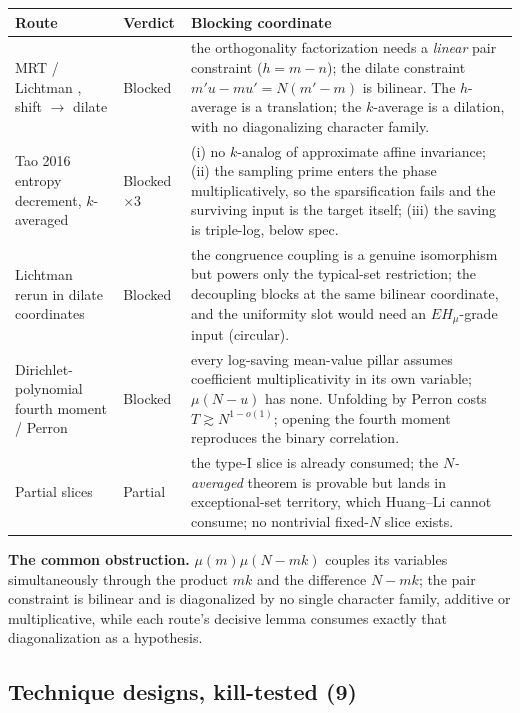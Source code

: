 \documentclass[11pt,a4paper]{article}
\theoremstyle{plain}
\theoremstyle{definition}
\begin{document}
\begin{longtable}{p{}p{}p{}}
\hline
Route & Verdict & Blocking coordinate\\
\hline
\endhead
MRT \cite{MRT15} / Lichtman \cite{Li20}, shift $\to$ dilate & Blocked &
 the orthogonality factorization needs a \emph{linear} pair
 constraint ($h = m-n$); the dilate constraint
 $m'u - mu' = N(m'-m)$ is bilinear. The $h$-average is a translation;
 the $k$-average is a dilation, with no diagonalizing character
 family.\\
Tao 2016 \cite{Tao} entropy decrement, $k$-averaged & Blocked $\times 3$ &
 (i) no $k$-analog of approximate affine invariance; (ii) the sampling
 prime enters the phase multiplicatively, so the sparsification fails
 and the surviving input is the target itself; (iii) the saving is
 triple-log, below spec.\\
Lichtman rerun in dilate coordinates \cite{Li23} & Blocked &
 the congruence coupling is a genuine isomorphism but powers only the
 typical-set restriction; the decoupling blocks at the same bilinear
 coordinate, and the uniformity slot would need an $EH_\mu$-grade
 input (circular).\\
Dirichlet-polynomial fourth moment / Perron & Blocked &
 every log-saving mean-value pillar assumes coefficient
 multiplicativity in its own variable; $\mu(N-u)$ has none. Unfolding
 by Perron costs $T \gtrsim N^{1-o(1)}$; opening the fourth moment
 reproduces the binary correlation.\\
Partial slices & Partial &
 the type-I slice is already consumed; the \emph{$N$-averaged}
 theorem is provable but lands in exceptional-set territory, which
 Huang--Li cannot consume; no nontrivial fixed-$N$ slice exists.\\
\hline
\end{longtable}

\noindent
\textbf{The common obstruction.} $\mu(m)\mu(N-mk)$ couples its
variables simultaneously through the product $mk$ and the difference
$N-mk$; the pair constraint is bilinear and is diagonalized by no
single character family, additive or multiplicative, while each
route's decisive lemma consumes exactly that diagonalization as a
hypothesis.

\subsection{Technique designs, kill-tested (9)}
\end{document}

